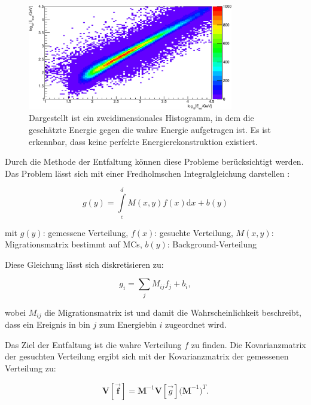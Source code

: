 \begin{figure}
    \centering
    \includegraphics[width=0.8\textwidth]{./Plots/04_MrkAnalyse/EnergyEst_EnergyTrue.pdf}
    \caption{Dargestellt ist ein zweidimensionales Histogramm, in dem die geschätzte Energie gegen die wahre Energie aufgetragen ist. 
    Es ist erkennbar, dass keine perfekte Energierekonstruktion existiert.}
    \label{EnergyEst_EnergyTrue}
\end{figure}

Durch die Methode der Entfaltung können diese Probleme berücksichtigt werden. 
Das Problem lässt sich mit einer Fredholmschen Integralgleichung darstellen \cite{Blobel}:

\begin{equation}
 g(y)= \int\limits_c^d M(x,y) f(x) \mathrm{d}x + b(y)
\end{equation}
\begin{center}
  \small{mit $g(y)$: gemessene Verteilung, $f(x)$: gesuchte Verteilung, $M(x,y)$: Migrationsmatrix bestimmt auf MCs, $b(y)$: Background-Verteilung}
 \end{center}

Diese Gleichung lässt sich diskretisieren zu:

\begin{equation}
 g_i=\sum_j M_{ij}f_j+b_i,
\end{equation}

wobei $M_{ij}$ die Migrationsmatrix ist und damit die Wahrscheinlichkeit beschreibt, dass ein Ereignis in bin $j$ zum Energiebin $i$ zugeordnet wird.

Das Ziel der Entfaltung ist die wahre Verteilung $f$ zu finden.
Die Kovarianzmatrix der gesuchten Verteilung ergibt sich mit der Kovarianzmatrix der gemessenen Verteilung zu:

\begin{equation}
 \mathbf{V[\vec{f}]}=\mathbf{M}^{-1}\mathbf{V}[\vec{g}]\mathbf{(M}^{-1})^T.
\end{equation}

